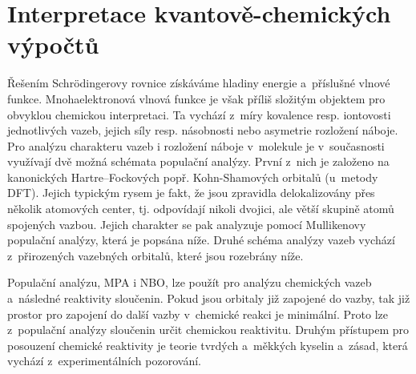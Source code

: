 \documentclass[
digital, %
table,   %
nolof,     %
nolot,     %
oneside,
]{fithesis3}
\begin{document}
\section{Interpretace kvantově-chemických výpočtů}
Řešením Schrödingerovy rovnice získáváme hladiny energie a~příslušné vlnové funkce. Mnohaelektronová vlnová funkce je však příliš složitým objektem pro obvyklou chemickou interpretaci. Ta vychází z~míry kovalence resp. iontovosti jednotlivých vazeb, jejich síly resp. násobnosti nebo asymetrie rozložení náboje. Pro analýzu charakteru vazeb i rozložení náboje v~molekule je v~současnosti využívají dvě možná schémata populační analýzy. První z~nich je založeno na kanonických Hartre--Fockových popř. Kohn-Shamových orbitalů (u~metody DFT). Jejich typickým rysem je fakt, že jsou zpravidla delokalizovány přes několik atomových center, tj. odpovídají nikoli dvojici, ale větší skupině atomů spojených vazbou. Jejich charakter se pak analyzuje pomocí Mullikenovy populační analýzy, která je popsána níže. Druhé schéma analýzy vazeb vychází z~přirozených vazebných orbitalů, které jsou rozebrány níže.

Populační analýzu, MPA i NBO, lze použít pro analýzu chemických vazeb a~následné reaktivity sloučenin. Pokud jsou orbitaly již zapojené do vazby, tak již prostor pro zapojení do další vazby v~chemické reakci je minimální. Proto lze z~populační analýzy sloučenin určit chemickou reaktivitu. Druhým přístupem pro posouzení chemické reaktivity je teorie tvrdých a~měkkých kyselin a~zásad, která vychází z~experimentálních pozorování.
\end{document}
